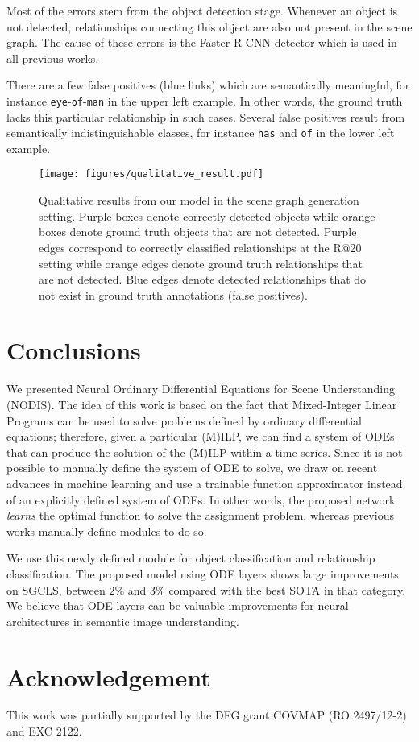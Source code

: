 \documentclass[runningheads]{llncs}
\begin{document}
Most of the errors stem from the object detection stage. Whenever an object is not detected, relationships connecting this object are also not present in the scene graph. The cause of these errors is the Faster R-CNN detector which is used in all previous works. 

There are a few false positives (blue links) which are semantically meaningful, for instance \texttt{eye}-\texttt{of}-\texttt{man} in the upper left example. In other words, the ground truth lacks this particular relationship in such cases. Several false positives result from semantically indistinguishable classes, for instance \texttt{has} and \texttt{of} in the lower left example. 

\begin{figure*}[!ht]
\centering
    \texttt{[image: figures/qualitative\_result.pdf]}
    \caption{Qualitative results from our model in the scene graph generation setting. 
    Purple boxes denote correctly detected objects while orange boxes denote ground truth objects that are not detected.
    Purple edges correspond to correctly classified relationships at the R@20 setting while orange edges denote ground truth relationships that are not detected. Blue edges denote detected relationships that do not exist in ground truth annotations (false positives).
}
    \label{fig:qualitative}
\end{figure*}


\section{Conclusions} 
\label{Sec:Concs}



We presented Neural Ordinary Differential Equations for Scene Understanding (NODIS). The idea of this work is based on the fact that Mixed-Integer Linear Programs can be used to solve problems defined by ordinary differential equations; therefore, given a particular (M)ILP, we can find a system of ODEs that can produce the solution of the (M)ILP within a time series. Since it is not possible to manually define the system of ODE to solve, we draw on recent advances in machine learning and use a trainable function approximator instead of an explicitly defined system of ODEs. 
In other words, the proposed network \emph{learns} the optimal function to solve the assignment problem, whereas previous works manually define modules to do so.

We use this newly defined module for object classification and relationship classification. 
The proposed model using ODE layers shows large improvements on SGCLS, between $2\%$ and $3\%$ compared with the best SOTA in that category. We believe that ODE layers can be valuable improvements for neural architectures in semantic image understanding. 
\section*{Acknowledgement}
This work was partially supported by the DFG grant COVMAP (RO 2497/12-2) and EXC 2122.



\clearpage


\end{document}
